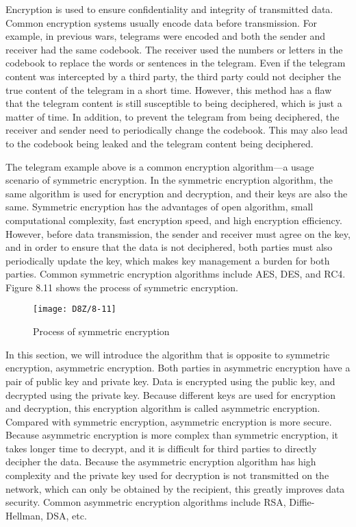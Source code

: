 \documentclass[a4paper,12pt]{book}
\begin{document}
Encryption is used to ensure confidentiality and integrity of transmitted data. Common encryption systems usually encode data before transmission. For example, in previous wars, telegrams were encoded and both the sender and receiver had the same codebook. The receiver used the numbers or letters in the codebook to replace the words or sentences in the telegram. Even if the telegram content was intercepted by a third party, the third party could not decipher the true content of the telegram in a short time. However, this method has a flaw that the telegram content is still susceptible to being deciphered, which is just a matter of time. In addition, to prevent the telegram from being deciphered, the receiver and sender need to periodically change the codebook. This may also lead to the codebook being leaked and the telegram content being deciphered.

The telegram example above is a common encryption algorithm—a usage scenario of symmetric encryption. In the symmetric encryption algorithm, the same algorithm is used for encryption and decryption, and their keys are also the same. Symmetric encryption has the advantages of open algorithm, small computational complexity, fast encryption speed, and high encryption efficiency. However, before data transmission, the sender and receiver must agree on the key, and in order to ensure that the data is not deciphered, both parties must also periodically update the key, which makes key management a burden for both parties. Common symmetric encryption algorithms include AES, DES, and RC4. Figure 8.11 shows the process of symmetric encryption.

\begin{figure}[!h]
    \centering
    \texttt{[image: D8Z/8-11]}
    \caption{Process of symmetric encryption}
\end{figure}

In this section, we will introduce the algorithm that is opposite to symmetric encryption, asymmetric encryption. Both parties in asymmetric encryption have a pair of public key and private key. Data is encrypted using the public key, and decrypted using the private key. Because different keys are used for encryption and decryption, this encryption algorithm is called asymmetric encryption. Compared with symmetric encryption, asymmetric encryption is more secure. Because asymmetric encryption is more complex than symmetric encryption, it takes longer time to decrypt, and it is difficult for third parties to directly decipher the data. Because the asymmetric encryption algorithm has high complexity and the private key used for decryption is not transmitted on the network, which can only be obtained by the recipient, this greatly improves data security. Common asymmetric encryption algorithms include RSA, Diffie-Hellman, DSA, etc.
\end{document}
